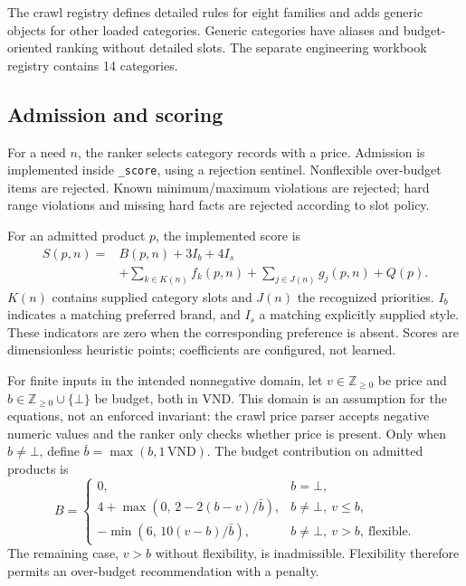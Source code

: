 \documentclass[conference,a4paper]{IEEEtran}
\newcommand{\code}[1]{\texttt{#1}}
\begin{document}
The crawl registry defines detailed rules for eight families and adds generic objects for other loaded categories. Generic categories have aliases and budget-oriented ranking without detailed slots. The separate engineering workbook registry contains 14 categories.

\subsection{Admission and scoring}
For a need $n$, the ranker selects category records with a price. Admission is implemented inside \code{\_score}, using a rejection sentinel. Nonflexible over-budget items are rejected. Known minimum/maximum violations are rejected; hard range violations and missing hard facts are rejected according to slot policy.

For an admitted product $p$, the implemented score is
\begin{equation}
\begin{split}
S(p,n)={}&B(p,n)+3I_b+4I_s\\
&+\sum_{k\in K(n)} f_k(p,n)+\sum_{j\in J(n)}g_j(p,n)+Q(p).
\end{split}\label{eq:score}
\end{equation}
$K(n)$ contains supplied category slots and $J(n)$ the recognized priorities. $I_b$ indicates a matching preferred brand, and $I_s$ a matching explicitly supplied style. These indicators are zero when the corresponding preference is absent. Scores are dimensionless heuristic points; coefficients are configured, not learned.

For finite inputs in the intended nonnegative domain, let $v\in\mathbb{Z}_{\ge0}$ be price and $b\in\mathbb{Z}_{\ge0}\cup\{\bot\}$ be budget, both in VND. This domain is an assumption for the equations, not an enforced invariant: the crawl price parser accepts negative numeric values and the ranker only checks whether price is present. Only when $b\ne\bot$, define $\bar b=\max(b,1\,\mathrm{VND})$. The budget contribution on admitted products is
\begin{equation}
B=\begin{cases}
0,&b=\bot,\\
4+\max(0,\,2-2(b-v)/\bar b),&b\ne\bot,\ v\le b,\\
-\min(6,\,10(v-b)/\bar b),&b\ne\bot,\ v>b,\ \text{flexible}.
\end{cases}\label{eq:budget}
\end{equation}
The remaining case, $v>b$ without flexibility, is inadmissible. Flexibility therefore permits an over-budget recommendation with a penalty.
\end{document}
